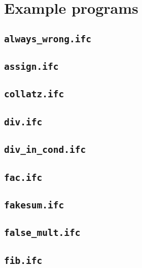 \section{Example programs}\label{sec:exampleprogs}

\subsection{\texttt{always\_wrong.ifc}}


\subsection{\texttt{assign.ifc}}


\subsection{\texttt{collatz.ifc}}


\subsection{\texttt{div.ifc}}


\subsection{\texttt{div\_in\_cond.ifc}}


\subsection{\texttt{fac.ifc}}


\subsection{\texttt{fakesum.ifc}}


\subsection{\texttt{false\_mult.ifc}}


\subsection{\texttt{fib.ifc}}


